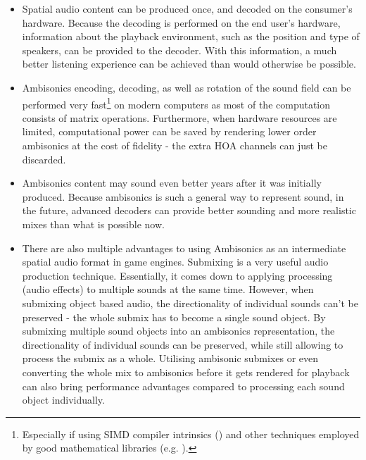 \begin{itemize}
    \item Spatial audio content can be produced once, and decoded on the consumer's hardware.
    Because the decoding is performed on the end user's hardware, information about the playback environment, 
    such as the position and type of speakers, can be provided to the decoder. 
    With this information, a much better listening experience can be achieved than would otherwise be possible. \cite{ebu_sbo_hoa}\cite{new_realities_in_audio}\cite{qualcomm_sba}

    \item Ambisonics encoding, decoding, as well as rotation of the sound field can be performed very 
    fast\footnote{Especially if using SIMD compiler intrinsics (\cite{matmult_simd}\cite{intel_simd}\cite{arm_simd}) and other techniques employed by good mathematical libraries (e.g. \cite{high_perf_math_lib}).}
    on modern computers as most of the computation consists of matrix operations.
    Furthermore, when hardware resources are limited, computational power can be saved by rendering lower order ambisonics at the cost of fidelity
    - the extra HOA channels can just be discarded. \cite{ebu_sbo_hoa}

    \item Ambisonics content may sound even better years after it was initially produced. 
    Because ambisonics is such a general way to represent sound, in the future, advanced decoders can provide better sounding and more realistic 
    mixes than what is possible now. \cite{new_realities_in_audio}

    \item There are also multiple advantages to using Ambisonics as an intermediate spatial audio format in game engines. 
    Submixing is a very useful audio production technique. Essentially, it comes down to applying processing (audio effects)
    to multiple sounds at the same time. However, when submixing object based audio, the directionality of individual sounds can't be preserved
    - the whole submix has to become a single sound object. By submixing multiple sound objects into an ambisonics representation,
    the directionality of individual sounds can be preserved, while still allowing to process the submix as a whole.
    Utilising ambisonic submixes or even converting the whole mix to ambisonics
    before it gets rendered for playback can also bring performance advantages compared to processing each sound object individually.
    \cite{wwise_working_with_oba}\cite{wwise_ambisonics_intermediate_repr}
\end{itemize}

